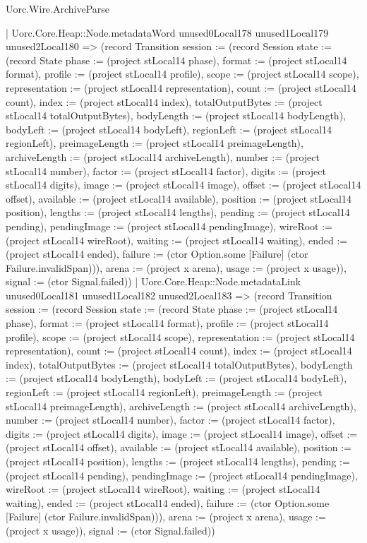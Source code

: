 \begin{lexlean}{Uorc.Wire.ArchiveParse}
\begin{semanticmodule}
{            | Uorc.Core.Heap::Node.metadataWord unused0Local178 unused1Local179 unused2Local180 => (record Transition {session := (record Session {state := (record State {phase := (project stLocal14 phase), format := (project stLocal14 format), profile := (project stLocal14 profile), scope := (project stLocal14 scope), representation := (project stLocal14 representation), count := (project stLocal14 count), index := (project stLocal14 index), totalOutputBytes := (project stLocal14 totalOutputBytes), bodyLength := (project stLocal14 bodyLength), bodyLeft := (project stLocal14 bodyLeft), regionLeft := (project stLocal14 regionLeft), preimageLength := (project stLocal14 preimageLength), archiveLength := (project stLocal14 archiveLength), number := (project stLocal14 number), factor := (project stLocal14 factor), digits := (project stLocal14 digits), image := (project stLocal14 image), offset := (project stLocal14 offset), available := (project stLocal14 available), position := (project stLocal14 position), lengths := (project stLocal14 lengths), pending := (project stLocal14 pending), pendingImage := (project stLocal14 pendingImage), wireRoot := (project stLocal14 wireRoot), waiting := (project stLocal14 waiting), ended := (project stLocal14 ended), failure := (ctor Option.some [Failure] (ctor Failure.invalidSpan))}), arena := (project x arena), usage := (project x usage)}), signal := (ctor Signal.failed)})
            | Uorc.Core.Heap::Node.metadataLink unused0Local181 unused1Local182 unused2Local183 => (record Transition {session := (record Session {state := (record State {phase := (project stLocal14 phase), format := (project stLocal14 format), profile := (project stLocal14 profile), scope := (project stLocal14 scope), representation := (project stLocal14 representation), count := (project stLocal14 count), index := (project stLocal14 index), totalOutputBytes := (project stLocal14 totalOutputBytes), bodyLength := (project stLocal14 bodyLength), bodyLeft := (project stLocal14 bodyLeft), regionLeft := (project stLocal14 regionLeft), preimageLength := (project stLocal14 preimageLength), archiveLength := (project stLocal14 archiveLength), number := (project stLocal14 number), factor := (project stLocal14 factor), digits := (project stLocal14 digits), image := (project stLocal14 image), offset := (project stLocal14 offset), available := (project stLocal14 available), position := (project stLocal14 position), lengths := (project stLocal14 lengths), pending := (project stLocal14 pending), pendingImage := (project stLocal14 pendingImage), wireRoot := (project stLocal14 wireRoot), waiting := (project stLocal14 waiting), ended := (project stLocal14 ended), failure := (ctor Option.some [Failure] (ctor Failure.invalidSpan))}), arena := (project x arena), usage := (project x usage)}), signal := (ctor Signal.failed)})
}
\end{semanticmodule}
\end{lexlean}
